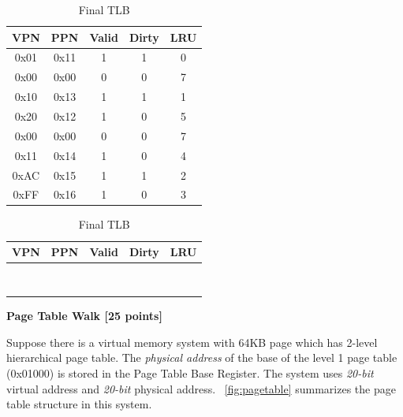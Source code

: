 \documentclass[addpoints, 12pt, answers]{exam}
\begin{document}
\begin{questions}
\begin{table}[H]
	\begin{minipage}[t]{0.5\linewidth}
		\centering
			\caption{Initial TLB}
			\label{tab:ini-tlb}
			\begin{tabular}{|c|c|c|c|c|}
			\hline
			VPN  & PPN  & Valid & Dirty & LRU \\ \hline
			0x01 & 0x11 & 1     & 1     & 0   \\ \hline
			0x00 & 0x00 & 0     & 0     & 7   \\ \hline
			0x10 & 0x13 & 1     & 1     & 1   \\ \hline
			0x20 & 0x12 & 1     & 0     & 5   \\ \hline
			0x00 & 0x00 & 0     & 0     & 7   \\ \hline
			0x11 & 0x14 & 1     & 0     & 4   \\ \hline
			0xAC & 0x15 & 1     & 1     & 2   \\ \hline
			0xFF & 0x16 & 1     & 0     & 3   \\ \hline
			\end{tabular}
	\end{minipage}
	\begin{minipage}[t]{0.5\linewidth}
		\centering
		\caption{Final TLB}
		\label{tab:fin-tlb}
		\begin{tabular}{|c|c|c|c|c|}
		\hline
		VPN  & PPN  & Valid & Dirty & LRU \\ \hline
		 &  &      &      &    \\ \hline
		 &  &      &      &    \\ \hline
		 &  &      &      &    \\ \hline
		 &  &      &      &    \\ \hline
		 &  &      &      &    \\ \hline
		 &  &      &      &    \\ \hline
		 &  &      &      &    \\ \hline
		 &  &      &      &    \\ \hline
		\end{tabular}
	\end{minipage}
\end{table}



\pagebreak
\question[25] \textbf{Page Table Walk [25 points]}

Suppose there is a virtual memory system with 64KB page which has 2-level hierarchical page table. 
The {\em physical address} of the base of the level 1 page table (0x01000) is stored in the Page Table Base Register. 
The system uses {\em 20-bit} virtual address and {\em 20-bit} physical address. 
~\autoref{fig:pagetable} summarizes the page table structure in this system. 


\end{questions}
\end{document}
